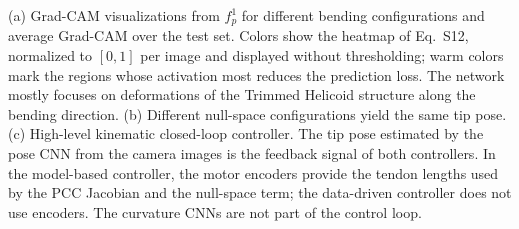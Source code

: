 \caption{(a) Grad-CAM visualizations from $f_p^1$ for different bending configurations and average Grad-CAM over the test set. Colors show the heatmap of Eq.~S12, normalized to $[0, 1]$ per image and displayed without thresholding; warm colors mark the regions whose activation most reduces the prediction loss. The network mostly focuses on deformations of the Trimmed Helicoid structure along the bending direction. (b) Different null-space configurations yield the same tip pose. (c) High-level kinematic closed-loop controller. The tip pose estimated by the pose CNN from the camera images is the feedback signal of both controllers. In the model-based controller, the motor encoders provide the tendon lengths used by the PCC Jacobian and the null-space term; the data-driven controller does not use encoders. The curvature CNNs are not part of the control loop.}
